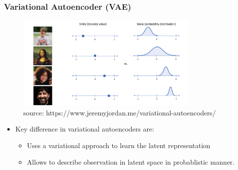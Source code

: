 \begin{frame}
\frametitle{Variational Autoencoder (VAE)}

                \begin{figure}
                \centering
                \includegraphics[width=9cm]{plots/vae_motivation.png}
                \vspace{-6pt}
                \caption{\tiny{source: https://www.jeremyjordan.me/variational-autoencoders/}}
                \end{figure}
                \vspace{-10pt}


\begin{itemize}
\item Key difference in variational autoencoders are:
  \begin{itemize}
    \item Uses a variational approach to learn the latent representation
    \item Allows to describe observation in latent space in probablistic manner.
  \end{itemize}     
\end{itemize}  



    
    







%


\end{frame}
